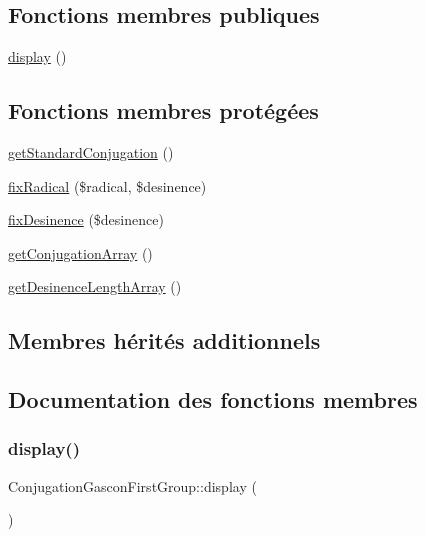 \subsection*{Fonctions membres publiques}
\begin{DoxyCompactItemize}
\item 
\hyperlink{class_conjugation_gascon_first_group_ace1bf96e8316a91e65e88f5e1e48c334}{display} ()
\end{DoxyCompactItemize}
\subsection*{Fonctions membres protégées}
\begin{DoxyCompactItemize}
\item 
\hyperlink{class_conjugation_gascon_first_group_a60ac1ed66054150563ec6f8812861c4a}{get\+Standard\+Conjugation} ()
\item 
\hyperlink{class_conjugation_gascon_first_group_ae03c569a6c3064a38d1eabeac9baf317}{fix\+Radical} (\$radical, \$desinence)
\item 
\hyperlink{class_conjugation_gascon_first_group_ad77d7a335be2cfd931aac7d90718c231}{fix\+Desinence} (\$desinence)
\item 
\hyperlink{class_conjugation_gascon_first_group_a982308fd578abc51d30b667d5099d0c2}{get\+Conjugation\+Array} ()
\item 
\hyperlink{class_conjugation_gascon_first_group_a03a995eb9d13945f5746bf20d45c4d7f}{get\+Desinence\+Length\+Array} ()
\end{DoxyCompactItemize}
\subsection*{Membres hérités additionnels}


\subsection{Documentation des fonctions membres}
\hypertarget{class_conjugation_gascon_first_group_ace1bf96e8316a91e65e88f5e1e48c334}{}\label{class_conjugation_gascon_first_group_ace1bf96e8316a91e65e88f5e1e48c334} 
\subsubsection{\texorpdfstring{display()}{display()}}
{\footnotesize\ttfamily Conjugation\+Gascon\+First\+Group\+::display (\begin{DoxyParamCaption}{ }\end{DoxyParamCaption})}



